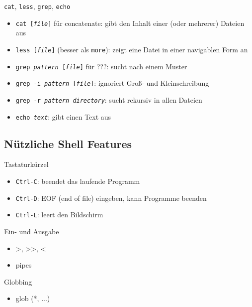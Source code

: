     \begin{frame}{\texttt{cat}, \texttt{less}, \texttt{grep}, \texttt{echo}}
      \begin{itemize}
        \item \texttt{cat [\textit{file}]} für concatenate: gibt den Inhalt einer (oder mehrerer) Dateien aus
        \item \texttt{less [\textit{file}]} (besser als \texttt{more}): zeigt eine Datei in einer navigablen Form an
        \item \texttt{grep \textit{pattern} [\textit{file}]} für ???: sucht nach einem Muster
        \item \texttt{grep -i \textit{pattern} [\textit{file}]}: ignoriert Groß- und Kleinschreibung
        \item \texttt{grep -r \textit{pattern} \textit{directory}}: sucht rekursiv in allen Dateien
        \item \texttt{echo \textit{text}}: gibt einen Text aus
      \end{itemize}
    \end{frame}

  \subsection{Nützliche Shell Features}
    \begin{frame}{Tastaturkürzel}
      \begin{itemize}
        \item \texttt{Ctrl-C}: beendet das laufende Programm
        \item \texttt{Ctrl-D}: EOF (end of file) eingeben, kann Programme beenden
        \item \texttt{Ctrl-L}: leert den Bildschirm
      \end{itemize}
    \end{frame}

    \begin{frame}{Ein- und Ausgabe}
      \begin{itemize}
        \item >, >>, <
        \item pipes
      \end{itemize}
    \end{frame}

    \begin{frame}{Globbing}
      \begin{itemize}
        \item glob (*, ...)
      \end{itemize}
    \end{frame}
